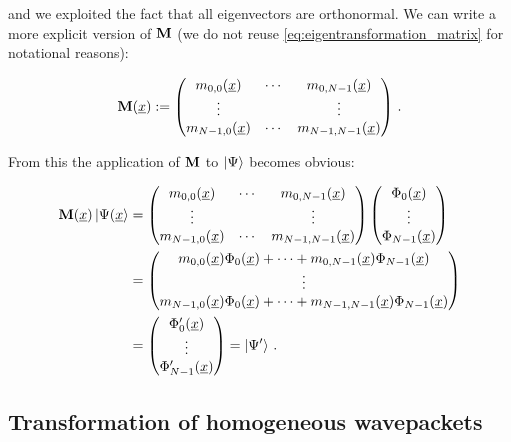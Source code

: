 and we exploited the fact that all eigenvectors are orthonormal. We can write a
more explicit version of $\mathbf{M}$ (we do not reuse \ref{eq:eigentransformation_matrix}
for notational reasons):

\begin{equation*}
  \mathbf{M}(\underline{x}) :=
  \begin{pmatrix}
    m_{0,0}(\underline{x})   & \cdots & m_{0,N-1}(\underline{x}) \\
    \vdots             &        & \vdots \\
    m_{N-1,0}(\underline{x}) & \cdots & m_{N-1,N-1}(\underline{x})
  \end{pmatrix} \,.
\end{equation*}

From this the application of $\mathbf{M}$ to $\Ket{\Psi}$ becomes obvious:

\begin{align*}
  \mathbf{M}(\underline{x}) \Ket{\Psi(\underline{x}} & =
  \begin{pmatrix}
    m_{0,0}(\underline{x})   & \cdots & m_{0,N-1}(\underline{x}) \\
    \vdots             &        & \vdots \\
    m_{N-1,0}(\underline{x}) & \cdots & m_{N-1,N-1}(\underline{x})
  \end{pmatrix}
  \begin{pmatrix}
    \Phi_0(\underline{x}) \\
    \vdots \\
    \Phi_{N-1}(\underline{x})
  \end{pmatrix} \\
  & =
  \begin{pmatrix}
    m_{0,0}(\underline{x}) \Phi_0(\underline{x}) + \cdots + m_{0,N-1}(\underline{x}) \Phi_{N-1}(\underline{x}) \\
    \vdots \\
    m_{N-1,0}(\underline{x}) \Phi_0(\underline{x}) + \cdots + m_{N-1,N-1}(\underline{x}) \Phi_{N-1}(\underline{x})
  \end{pmatrix} \\
  & =
  \begin{pmatrix}
    \Phi_0^\prime(\underline{x}) \\
    \vdots \\
    \Phi_{N-1}^\prime(\underline{x})
  \end{pmatrix}
  = \Ket{\Psi^\prime} \,.
\end{align*}


\subsection{Transformation of homogeneous wavepackets}


